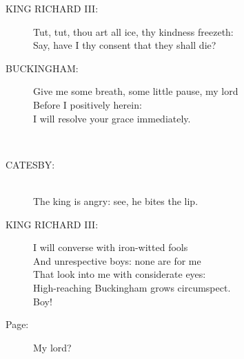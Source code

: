 \documentclass{article}
\begin{document}
\begin{description}
\item[KING RICHARD III:] 
\hspace{1pt}Tut, tut, thou art all ice, thy kindness freezeth:\\
\hspace{1pt}Say, have I thy consent that they shall die?\\
\end{description}
\begin{description}
\item[BUCKINGHAM:] 
\hspace{1pt}Give me some breath, some little pause, my lord\\
\hspace{1pt}Before I positively herein:\\
\hspace{1pt}I will resolve your grace immediately.\\
\end{description}
\centering{\it [Exit]}\\
\begin{description}
\item[CATESBY:] 
\hspace{1pt}\\
\hspace{1pt}The king is angry: see, he bites the lip.\\
\end{description}
\begin{description}
\item[KING RICHARD III:] 
\hspace{1pt}I will converse with iron-witted fools\\
\hspace{1pt}And unrespective boys: none are for me\\
\hspace{1pt}That look into me with considerate eyes:\\
\hspace{1pt}High-reaching Buckingham grows circumspect.\\
\hspace{1pt}Boy!\\
\end{description}
\begin{description}
\item[Page:] 
\hspace{1pt}My lord?\\
\end{description}
\end{document}
